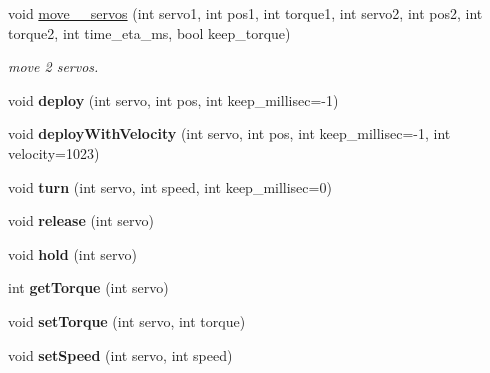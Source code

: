 \begin{DoxyCompactItemize}
\mbox{\label{classServoObjectsSystem_a94b9c90a7ac3e690f6d002a008532ecb}} 
void \hyperlink{classServoObjectsSystem_a94b9c90a7ac3e690f6d002a008532ecb}{move\+\_\+\_\+servos} (int servo1, int pos1, int torque1, int servo2, int pos2, int torque2, int time\+\_\+eta\+\_\+ms, bool keep\+\_\+torque)
\begin{DoxyCompactList}\small\item\em move 2 servos. \end{DoxyCompactList}\item 
\mbox{\label{classServoObjectsSystem_a6df7e1694087d2fa67d41aeef363b3f3}} 
void {\bfseries deploy} (int servo, int pos, int keep\+\_\+millisec=-\/1)
\item 
\mbox{\label{classServoObjectsSystem_a9b4f3b7fe486a78d42e8b59e8664a764}} 
void {\bfseries deploy\+With\+Velocity} (int servo, int pos, int keep\+\_\+millisec=-\/1, int velocity=1023)
\item 
\mbox{\label{classServoObjectsSystem_a5e0e2b1e10cecd6254b3421f564f119d}} 
void {\bfseries turn} (int servo, int speed, int keep\+\_\+millisec=0)
\item 
\mbox{\label{classServoObjectsSystem_aee9ba86b5c2d9cb07aff947f28812b83}} 
void {\bfseries release} (int servo)
\item 
\mbox{\label{classServoObjectsSystem_a6a01a4858975287a97fdbc96f3ac08c7}} 
void {\bfseries hold} (int servo)
\item 
\mbox{\label{classServoObjectsSystem_a8e90807ffba5c905f81304db1708572f}} 
int {\bfseries get\+Torque} (int servo)
\item 
\mbox{\label{classServoObjectsSystem_acf68a1b28ef93c8d960b84e008e9c974}} 
void {\bfseries set\+Torque} (int servo, int torque)
\item 
\mbox{\label{classServoObjectsSystem_a39f1221512cd050bdfd985c74b39a56a}} 
void {\bfseries set\+Speed} (int servo, int speed)
\item 

\end{DoxyCompactItemize}

